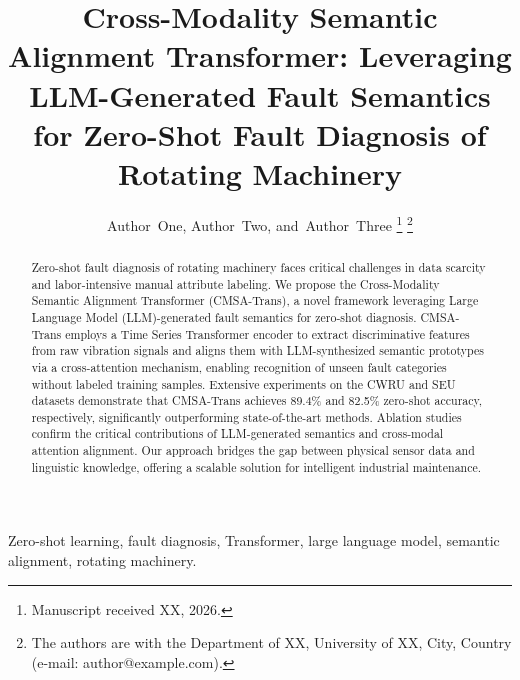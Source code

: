 \documentclass[journal]{IEEEtran}
\begin{document}
\title{Cross-Modality Semantic Alignment Transformer: Leveraging LLM-Generated Fault Semantics for Zero-Shot Fault Diagnosis of Rotating Machinery}

\author{Author~One,
        Author~Two,
        and~Author~Three
\thanks{Manuscript received XX, 2026.}
\thanks{The authors are with the Department of XX, University of XX, City, Country (e-mail: author@example.com).}}


\maketitle

\begin{abstract}
Zero-shot fault diagnosis of rotating machinery faces critical challenges in data scarcity and labor-intensive manual attribute labeling. We propose the Cross-Modality Semantic Alignment Transformer (CMSA-Trans), a novel framework leveraging Large Language Model (LLM)-generated fault semantics for zero-shot diagnosis. CMSA-Trans employs a Time Series Transformer encoder to extract discriminative features from raw vibration signals and aligns them with LLM-synthesized semantic prototypes via a cross-attention mechanism, enabling recognition of unseen fault categories without labeled training samples. Extensive experiments on the CWRU and SEU datasets demonstrate that CMSA-Trans achieves 89.4\% and 82.5\% zero-shot accuracy, respectively, significantly outperforming state-of-the-art methods. Ablation studies confirm the critical contributions of LLM-generated semantics and cross-modal attention alignment. Our approach bridges the gap between physical sensor data and linguistic knowledge, offering a scalable solution for intelligent industrial maintenance.
\end{abstract}

\begin{IEEEkeywords}
Zero-shot learning, fault diagnosis, Transformer, large language model, semantic alignment, rotating machinery.
\end{IEEEkeywords}
\end{document}
